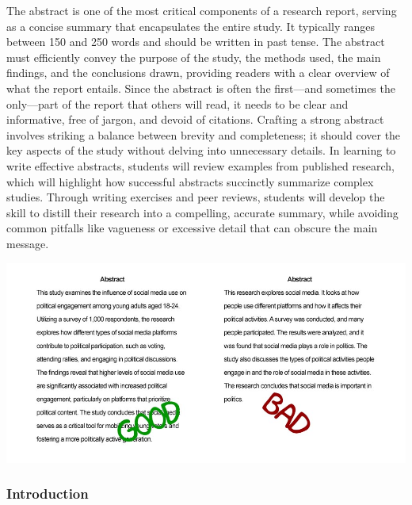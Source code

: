 \documentclass[
]{book}
\begin{document}
The abstract is one of the most critical components of a research report, serving as a concise summary that encapsulates the entire study. It typically ranges between 150 and 250 words and should be written in past tense. The abstract must efficiently convey the purpose of the study, the methods used, the main findings, and the conclusions drawn, providing readers with a clear overview of what the report entails. Since the abstract is often the first---and sometimes the only---part of the report that others will read, it needs to be clear and informative, free of jargon, and devoid of citations. Crafting a strong abstract involves striking a balance between brevity and completeness; it should cover the key aspects of the study without delving into unnecessary details. In learning to write effective abstracts, students will review examples from published research, which will highlight how successful abstracts succinctly summarize complex studies. Through writing exercises and peer reviews, students will develop the skill to distill their research into a compelling, accurate summary, while avoiding common pitfalls like vagueness or excessive detail that can obscure the main message.

\includegraphics[width=1\linewidth,height=\textheight,keepaspectratio]{images/fig081.jpg}

\subsubsection*{Introduction}\label{introduction}
\end{document}
